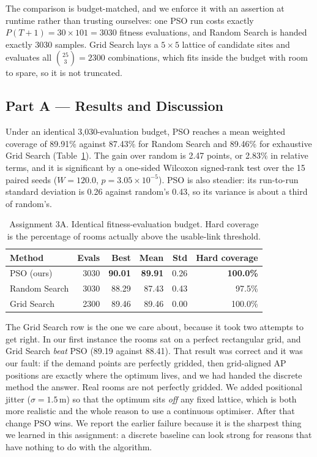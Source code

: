 \documentclass{ai-lab-report}
\begin{document}
The comparison is budget-matched, and we enforce it with an assertion at runtime rather than
trusting ourselves: one PSO run costs exactly $P(T+1) = 30 \times 101 = 3030$ fitness
evaluations, and Random Search is handed exactly 3030 samples. Grid Search lays a $5\times5$
lattice of candidate sites and evaluates all $\binom{25}{3} = 2300$ combinations, which fits
inside the budget with room to spare, so it is not truncated.

\subsection{Part A --- Results and Discussion}
\label{sec:a3a-results}
Under an identical 3{,}030-evaluation budget, PSO reaches a mean weighted coverage of 89.91\%
against 87.43\% for Random Search and 89.46\% for exhaustive Grid Search
(Table~\ref{tab:a3a}). The gain over random is 2.47 points, or 2.83\% in relative terms, and it
is significant by a one-sided Wilcoxon signed-rank test over the 15 paired seeds
($W = 120.0$, $p = 3.05 \times 10^{-5}$). PSO is also steadier: its run-to-run standard
deviation is 0.26 against random's 0.43, so its variance is about a third of random's.

\begin{table}[H]
\centering
\caption{Assignment 3A. Identical fitness-evaluation budget. Hard coverage is the percentage
of rooms actually above the usable-link threshold.}
\label{tab:a3a}
\begin{tabular}{lrrrrr}
\toprule
Method & Evals & Best & Mean & Std & Hard coverage \\
\midrule
PSO (ours)    & 3030 & \textbf{90.01} & \textbf{89.91} & 0.26 & \textbf{100.0\%} \\
Random Search & 3030 & 88.29 & 87.43 & 0.43 & 97.5\% \\
Grid Search   & 2300 & 89.46 & 89.46 & 0.00 & 100.0\% \\
\bottomrule
\end{tabular}
\end{table}

The Grid Search row is the one we care about, because it took two attempts to get right. In
our first instance the rooms sat on a perfect rectangular grid, and Grid Search \emph{beat}
PSO (89.19 against 88.41). That result was correct and it was our fault: if the demand points
are perfectly gridded, then grid-aligned AP positions are exactly where the optimum lives, and
we had handed the discrete method the answer. Real rooms are not perfectly gridded. We added
positional jitter ($\sigma = 1.5$\,m) so that the optimum sits \emph{off} any fixed lattice,
which is both more realistic and the whole reason to use a continuous optimiser. After that
change PSO wins. We report the earlier failure because it is the sharpest thing we learned in
this assignment: a discrete baseline can look strong for reasons that have nothing to do with
the algorithm.
\end{document}
